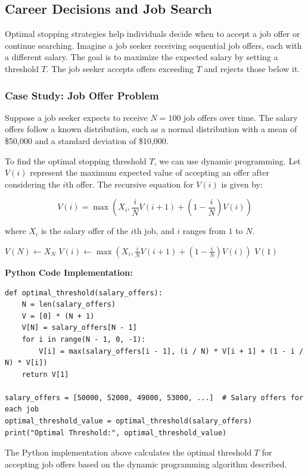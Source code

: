 \documentclass[12pt]{book} %
\begin{document}
\subsection{Career Decisions and Job Search}

Optimal stopping strategies help individuals decide when to accept a job offer or continue searching. Imagine a job seeker receiving sequential job offers, each with a different salary. The goal is to maximize the expected salary by setting a threshold \(T\). The job seeker accepts offers exceeding \(T\) and rejects those below it.


\subsubsection{Case Study: Job Offer Problem}

Suppose a job seeker expects to receive \(N = 100\) job offers over time. The salary offers follow a known distribution, such as a normal distribution with a mean of \$50,000 and a standard deviation of \$10,000.

To find the optimal stopping threshold \(T\), we can use dynamic programming. Let \(V(i)\) represent the maximum expected value of accepting an offer after considering the \(i\)th offer. The recursive equation for \(V(i)\) is given by:

\[
V(i) = \max\left(X_i, \frac{i}{N}V(i+1) + \left(1 - \frac{i}{N}\right)V(i)\right)
\]

where \(X_i\) is the salary offer of the \(i\)th job, and \(i\) ranges from \(1\) to \(N\).
\FloatBarrier
\begin{algorithm}
\caption{Dynamic Programming Algorithm for Job Offer Problem}\label{alg:job_offer}
\begin{algorithmic}[1]
\State $V(N) \gets X_N$
    \State $V(i) \gets \max(X_i, \frac{i}{N}V(i+1) + \left(1 - \frac{i}{N}\right)V(i))$
\EndFor
\State \Return $V(1)$
\EndFunction
\end{algorithmic}
\end{algorithm}
\FloatBarrier
\textbf{Python Code Implementation:}
\FloatBarrier
\begin{lstlisting}
def optimal_threshold(salary_offers):
    N = len(salary_offers)
    V = [0] * (N + 1)
    V[N] = salary_offers[N - 1]
    for i in range(N - 1, 0, -1):
        V[i] = max(salary_offers[i - 1], (i / N) * V[i + 1] + (1 - i / N) * V[i])
    return V[1]

salary_offers = [50000, 52000, 49000, 53000, ...]  # Salary offers for each job
optimal_threshold_value = optimal_threshold(salary_offers)
print("Optimal Threshold:", optimal_threshold_value)
\end{lstlisting}
\FloatBarrier
The Python implementation above calculates the optimal threshold \(T\) for accepting job offers based on the dynamic programming algorithm described.
\end{document}
